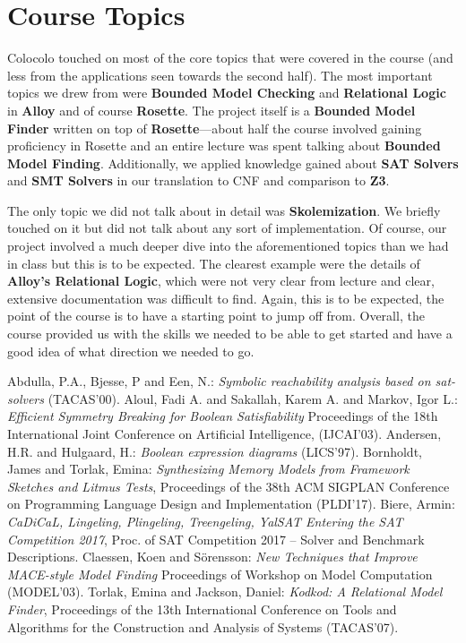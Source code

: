 \documentclass[10pt]{article}
\theoremstyle{definition}
\begin{document}
  \section{Course Topics}

  Colocolo touched on most of the core topics that were covered in the course (and less from the applications seen towards the second half). The most important topics we drew from were \textbf{Bounded Model Checking} and \textbf{Relational Logic} in \textbf{Alloy} and of course \textbf{Rosette}. The project itself is a \textbf{Bounded Model Finder} written on top of \textbf{Rosette}---about half the course involved gaining proficiency in Rosette and an entire lecture was spent talking about \textbf{Bounded Model Finding}. Additionally, we applied knowledge gained about \textbf{SAT Solvers} and \textbf{SMT Solvers} in our translation to CNF and comparison to \textbf{Z3}.

  The only topic we did not talk about in detail was \textbf{Skolemization}. We briefly touched on it but did not talk about any sort of implementation. Of course, our project involved a much deeper dive into the aforementioned topics than we had in class but this is to be expected. The clearest example were the details of \textbf{Alloy's Relational Logic}, which were not very clear from lecture and clear, extensive documentation was difficult to find. Again, this is to be expected, the point of the course is to have a starting point to jump off from. Overall, the course provided us with the skills we needed to be able to get started and have a good idea of what direction we needed to go.

  \clearpage
  \begin{thebibliography}{999}
        Abdulla, P.A., Bjesse, P and Een, N.:
        \emph{Symbolic reachability analysis based on sat-solvers}
        (TACAS'00).
        Aloul, Fadi A. and Sakallah, Karem A. and Markov, Igor L.:
        \emph{Efficient Symmetry Breaking for Boolean Satisfiability}
        Proceedings of the 18th International Joint Conference on Artificial Intelligence, (IJCAI'03).
        Andersen, H.R. and Hulgaard, H.:
        \emph{Boolean expression diagrams}
        (LICS'97).
        Bornholdt, James and Torlak, Emina:
        \emph{Synthesizing Memory Models from Framework Sketches and Litmus Tests},
        Proceedings of the 38th ACM SIGPLAN Conference on Programming Language Design and Implementation (PLDI'17).
        Biere, Armin:
        \emph{CaDiCaL, Lingeling, Plingeling, Treengeling, YalSAT Entering the SAT Competition 2017}, Proc. of SAT Competition 2017 -- Solver and Benchmark Descriptions.
        Claessen, Koen and S{\"o}rensson:
        \emph{New Techniques that Improve {MACE}-style Model Finding}
        Proceedings of Workshop on Model Computation (MODEL'03).
        Torlak, Emina and Jackson, Daniel:
        \emph{Kodkod: A Relational Model Finder},
        Proceedings of the 13th International Conference on Tools and Algorithms for the Construction and Analysis of Systems (TACAS'07).
    \end{thebibliography}
\end{document}
